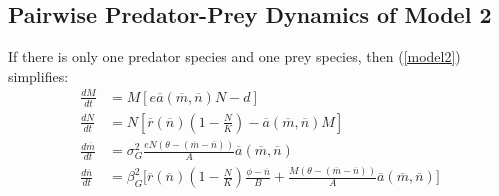 \documentclass{amsart}
\theoremstyle{definition}
\theoremstyle{remark}
\numberwithin{equation}{section}
\begin{document}
\subsection{Pairwise Predator-Prey Dynamics of Model 2}
If there is only one predator species and one prey species, then (\ref{model2}) simplifies:
\begin{subequations}
	\label{MODEL2}
	\begin{align}
		\label{eq:MODEL2_A}
		\frac{dM}{dt} &= M\left[e\overline{a}(\overline{m}, \overline{n})N - d\right] \\[5px]
		\label{eq:MODEL2_B}
		\frac{dN}{dt} &= N\left[\overline{r}(\overline{n})\left(1 - \frac{N}{K}\right) - \overline{a}(\overline{m}, \overline{n})M\right] \\[5px]
		\label{eq:MODEL2_C}
		\frac{d\overline{m}}{dt} &= \sigma_{G}^2\frac{eN(\theta - (\overline{m} - \overline{n}))}{A}\overline{a}(\overline{m}, \overline{n}) \\[5px]
		\label{eq:MODEL2_D}
		\frac{d\overline{n}}{dt} &= \beta_{G}^2\Bigg[\overline{r}(\overline{n})\left(1 - \frac{N}{K}\right)\frac{\phi - \overline{n}}{B} + \frac{M(\theta - (\overline{m} - \overline{n}))}{A}\overline{a}(\overline{m}, \overline{n})\Bigg]
	\end{align}
\end{subequations}
\end{document}
